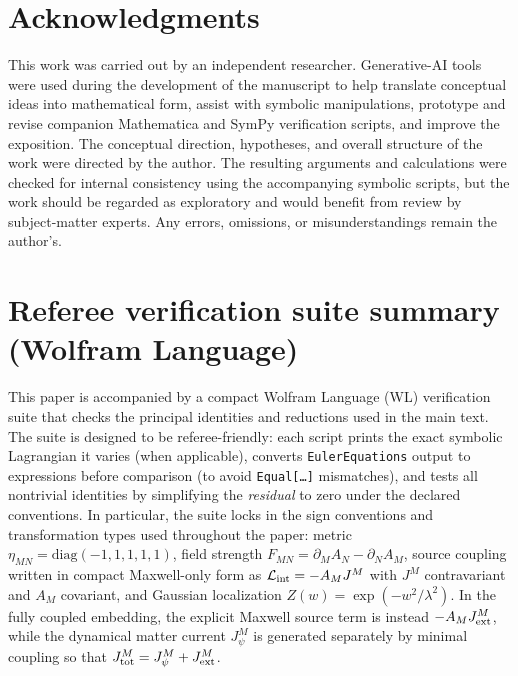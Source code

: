 \documentclass[11pt]{article}
\newcommand{\A}{A}
\newcommand{\F}{F}
\newcommand{\J}{J}
\newcommand{\Z}{Z}
\newcommand{\lam}{\lambda}      %
\newcommand{\Jpsi}{J_\psi}
\newcommand{\Jext}{J_{\rm ext}}
\newcommand{\Jtot}{J_{\rm tot}}
\begin{document}
\section*{Acknowledgments}
This work was carried out by an independent researcher. Generative-AI tools were
used during the development of the manuscript to help translate conceptual ideas
into mathematical form, assist with symbolic manipulations, prototype and revise
companion Mathematica and SymPy verification scripts, and improve the
exposition. The conceptual direction, hypotheses, and overall structure of the
work were directed by the author. The resulting arguments and calculations were
checked for internal consistency using the accompanying symbolic scripts, but
the work should be regarded as exploratory and would benefit from review by
subject-matter experts. Any errors, omissions, or misunderstandings remain the
author's.

\appendix

\section{Referee verification suite summary (Wolfram Language)}
\label{app:wl_suite}

This paper is accompanied by a compact Wolfram Language (WL) verification suite
that checks the principal identities and reductions used in the main text. The
suite is designed to be referee-friendly: each script prints the exact symbolic
Lagrangian it varies (when applicable), converts \texttt{EulerEquations} output to
expressions before comparison (to avoid \texttt{Equal[\dots]} mismatches), and
tests all nontrivial identities by simplifying the \emph{residual} to zero under
the declared conventions. In particular, the suite locks in the sign conventions
and transformation types used throughout the paper: metric
\(\eta_{MN}=\mathrm{diag}(-1,1,1,1,1)\), field strength
\(\F_{MN}=\partial_M\A_N-\partial_N\A_M\), source coupling written in compact
Maxwell-only form as \(\mathcal L_{\rm int}=-\A_M\J^M\) with \(\J^M\)
contravariant and \(\A_M\) covariant, and Gaussian localization
\(\Z(w)=\exp(-w^2/\lam^2)\). In the fully coupled embedding, the explicit
Maxwell source term is instead \(-\A_M\Jext^M\), while the dynamical matter
current \(\Jpsi^M\) is generated separately by minimal coupling so that
\(\Jtot^M=\Jpsi^M+\Jext^M\).
\end{document}
